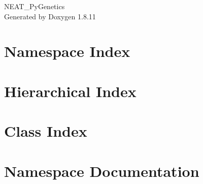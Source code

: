 \documentclass[twoside]{book}
\newcommand{\+}{\discretionary{\mbox{\scriptsize$\hookleftarrow$}}{}{}}
\newcommand{\clearemptydoublepage}{%
  \newpage{\pagestyle{empty}\cleardoublepage}%
}
\begin{document}
\hypersetup{pageanchor=false,
             bookmarksnumbered=true,
             pdfencoding=unicode
            }
\begin{titlepage}
\vspace*{7cm}
\begin{center}%
{\Large N\+E\+A\+T\+\_\+\+Py\+Genetics }\\
\vspace*{1cm}
{\large Generated by Doxygen 1.8.11}\\
\end{center}
\end{titlepage}
\clearemptydoublepage
\tableofcontents
\clearemptydoublepage
{}
\hypersetup{pageanchor=true}

\chapter{Namespace Index}

\chapter{Hierarchical Index}

\chapter{Class Index}

\chapter{Namespace Documentation}


\end{document}
